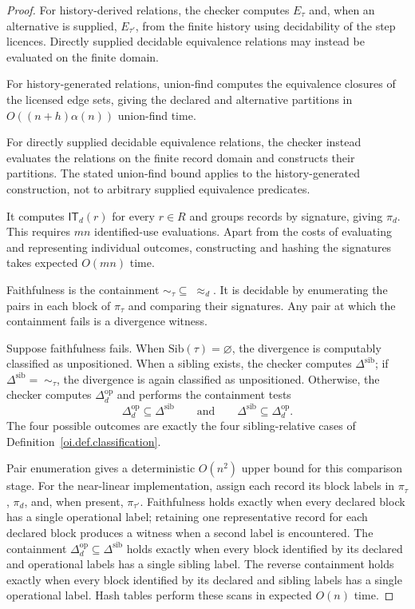 \documentclass[11pt]{article}
\theoremstyle{plain}
\theoremstyle{definition}
\theoremstyle{remark}
\newcommand{\Sib}{\ensuremath{\mathrm{Sib}}}
\newcommand{\IT}{\ensuremath{\mathsf{IT}}}
\newcommand{\Ker}{\ensuremath{\mathrel{\approx_{d}}}}
\newcommand{\Dop}{\ensuremath{\Delta^{\mathrm{op}}_{d}}}
\newcommand{\Dsib}{\ensuremath{\Delta^{\mathrm{sib}}}}
\begin{document}
\begin{proof}
  For history-derived relations, the checker computes
  \(E_{\tau}\) and, when an alternative is supplied,
  \(E_{\tau'}\), from the finite history using
  decidability of the step licences.
  Directly supplied decidable equivalence relations
  may instead be evaluated on the finite domain.

  For history-generated relations, union-find computes
  the equivalence closures of the licensed edge sets,
  giving the declared and alternative partitions
  in \(O((n+h)\alpha(n))\) union-find time.

  For directly supplied decidable equivalence relations,
  the checker instead evaluates the relations on the
  finite record domain and constructs their partitions.
  The stated union-find bound applies to the
  history-generated construction, not to arbitrary
  supplied equivalence predicates.

  It computes \(\IT_d(r)\) for every \(r\in R\)
  and groups records by signature, giving \(\pi_d\).
  This requires \(mn\) identified-use evaluations.
  Apart from the costs of evaluating and representing individual outcomes,
  constructing and hashing the signatures takes expected \(O(mn)\) time.

  Faithfulness is the containment
  \(\sim_{\tau}\subseteq\;\Ker\).
  It is decidable by enumerating the pairs
  in each block of \(\pi_{\tau}\)
  and comparing their signatures.
  Any pair at which the containment fails
  is a divergence witness.

  Suppose faithfulness fails.
  When \(\Sib(\tau)=\varnothing\),
  the divergence is computably classified as unpositioned.
  When a sibling exists, the checker computes \(\Dsib\);
  if \(\Dsib=\;\sim_{\tau}\),
  the divergence is again classified as unpositioned.
  Otherwise, the checker computes $\Dop$
  and performs the containment tests
  \[
    \Dop\subseteq\Dsib
    \qquad\text{and}\qquad
    \Dsib\subseteq\Dop.
  \]
  The four possible outcomes are exactly
  the four sibling-relative cases of
  Definition~\ref{oi.def.classification}.

  Pair enumeration gives a deterministic \(O(n^2)\)
  upper bound for this comparison stage.
  For the near-linear implementation,
  assign each record its block labels in
  \(\pi_{\tau}\), \(\pi_d\), and, when present, \(\pi_{\tau'}\).
  Faithfulness holds exactly when every declared block
  has a single operational label;
  retaining one representative record for each declared block
  produces a witness when a second label is encountered.
  The containment \(\Dop\subseteq\Dsib\) holds exactly when
  every block identified by its declared and operational labels
  has a single sibling label.
  The reverse containment holds exactly when
  every block identified by its declared and sibling labels
  has a single operational label.
  Hash tables perform these scans in expected \(O(n)\) time.
\end{proof}
\end{document}
